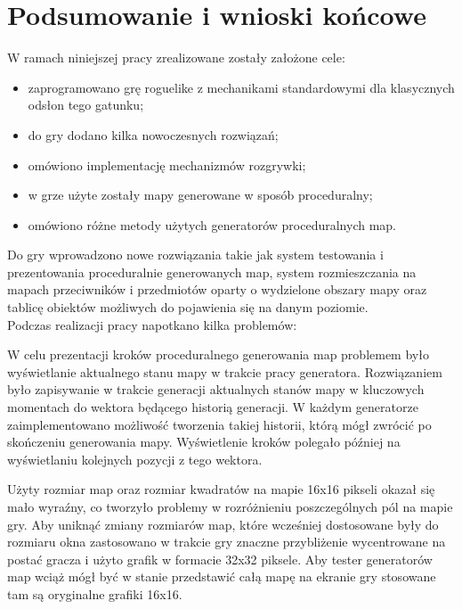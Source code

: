 \documentclass[12pt,twoside]{article}
\begin{document}
\section*{Podsumowanie i wnioski końcowe}

W ramach niniejszej pracy zrealizowane zostały założone cele: 
\begin{itemize}
	\item zaprogramowano grę roguelike z mechanikami standardowymi dla klasycznych odsłon tego gatunku;
	\item do gry dodano kilka nowoczesnych rozwiązań;
	\item omówiono implementację mechanizmów rozgrywki;
	\item w grze użyte zostały mapy generowane w sposób proceduralny;
	\item omówiono różne metody użytych generatorów proceduralnych map.
\end{itemize}

Do gry wprowadzono nowe rozwiązania takie jak system testowania i prezentowania proceduralnie generowanych map, system rozmieszczania na mapach przeciwników i przedmiotów oparty o wydzielone obszary mapy oraz tablicę obiektów możliwych do pojawienia się na danym poziomie.
\\

Podczas realizacji pracy napotkano kilka problemów:

W celu prezentacji kroków proceduralnego generowania map problemem było wyświetlanie aktualnego stanu mapy w trakcie pracy generatora. Rozwiązaniem było zapisywanie w trakcie generacji aktualnych stanów mapy w kluczowych momentach do wektora będącego historią generacji. W każdym generatorze zaimplementowano możliwość tworzenia takiej historii, którą mógł zwrócić po skończeniu generowania mapy. Wyświetlenie kroków polegało później na wyświetlaniu kolejnych pozycji z tego wektora.

Użyty rozmiar map oraz rozmiar kwadratów na mapie 16x16 pikseli okazał się mało wyraźny, co tworzyło problemy w rozróżnieniu poszczególnych pól na mapie gry. Aby uniknąć zmiany rozmiarów map, które wcześniej dostosowane były do rozmiaru okna zastosowano w trakcie gry znaczne przybliżenie wycentrowane na postać gracza i użyto grafik w formacie 32x32 piksele. Aby tester generatorów map wciąż mógł być w stanie przedstawić całą mapę na ekranie gry stosowane tam są oryginalne grafiki 16x16. \\
\end{document}
